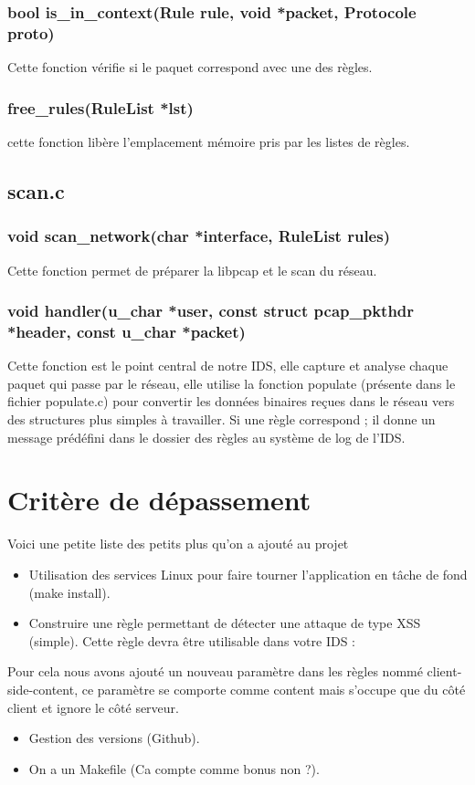\documentclass[a4paper]{report}
\begin{document}
\section{bool is\_in\_context(Rule rule, void *packet, Protocole proto)}
\label{sec:org499a58b}
Cette fonction vérifie si le paquet correspond avec une des règles.
\section{free\_rules(RuleList *lst)}
\label{sec:org76e0eca}
cette fonction libère l'emplacement mémoire pris par les listes de règles.
\chapter{scan.c}
\label{sec:org43ece51}
\section{void scan\_network(char *interface, RuleList rules)}
\label{sec:org5dc8df8}
Cette fonction permet de préparer la libpcap et le scan du réseau.
\section{void handler(u\_char *user, const struct pcap\_pkthdr *header, const u\_char *packet)}
\label{sec:org564e8a6}
Cette fonction est le point central de notre IDS, elle capture et analyse chaque paquet qui passe par le réseau, 
elle utilise la fonction populate (présente dans le fichier populate.c) pour convertir les données binaires reçues dans le réseau
vers des structures plus simples à travailler. Si une règle correspond ; il donne un message prédéfini dans le dossier des règles au système de log de l'IDS.
\part{Critère de dépassement}
\label{sec:org8df707a}
Voici une petite liste des petits plus qu'on a ajouté au projet
\begin{itemize}
\item Utilisation des services Linux pour faire tourner l’application en tâche de fond (make install).
\item Construire une règle permettant de détecter une attaque de type XSS (simple).  Cette règle devra être utilisable dans votre IDS :
\end{itemize}
Pour cela nous avons ajouté un nouveau paramètre dans les règles nommé client-side-content, ce paramètre se comporte comme content mais s'occupe que du côté client et ignore le côté serveur.
\begin{itemize}
\item Gestion des versions (Github).
\item On a un Makefile (Ca compte comme bonus non ?).
\end{itemize}
\end{document}
